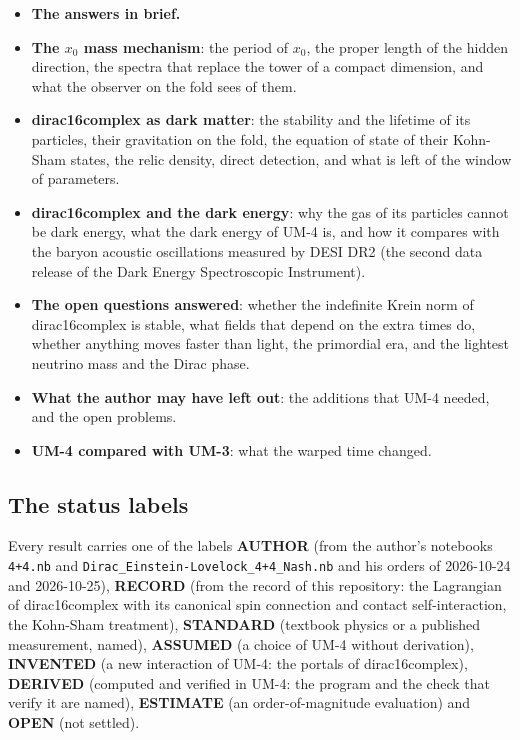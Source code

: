 \documentclass[
  10pt,
]{article}
\providecommand{\tightlist}{%
  \setlength{\itemsep}{0pt}\setlength{\parskip}{0pt}}
\begin{document}
\begin{itemize}
\tightlist
\item
  \textbf{The answers in brief.}
\item
  \textbf{The \(x_0\) mass mechanism}: the period of \(x_0\), the proper
  length of the hidden direction, the spectra that replace the tower of
  a compact dimension, and what the observer on the fold sees of them.
\item
  \textbf{dirac16complex as dark matter}: the stability and the lifetime
  of its particles, their gravitation on the fold, the equation of state
  of their Kohn-Sham states, the relic density, direct detection, and
  what is left of the window of parameters.
\item
  \textbf{dirac16complex and the dark energy}: why the gas of its
  particles cannot be dark energy, what the dark energy of UM-4 is, and
  how it compares with the baryon acoustic oscillations measured by DESI
  DR2 (the second data release of the Dark Energy Spectroscopic
  Instrument).
\item
  \textbf{The open questions answered}: whether the indefinite Krein
  norm of dirac16complex is stable, what fields that depend on the extra
  times do, whether anything moves faster than light, the primordial
  era, and the lightest neutrino mass and the Dirac phase.
\item
  \textbf{What the author may have left out}: the additions that UM-4
  needed, and the open problems.
\item
  \textbf{UM-4 compared with UM-3}: what the warped time changed.
\end{itemize}

\hypertarget{the-status-labels}{%
\subsection{The status labels}\label{the-status-labels}}

Every result carries one of the labels \textbf{AUTHOR} (from the
author's notebooks \texttt{4+4.nb} and
\texttt{Dirac\_Einstein-Lovelock\_4+4\_Nash.nb} and his orders of
2026-10-24 and 2026-10-25), \textbf{RECORD} (from the record of this
repository: the Lagrangian of dirac16complex with its canonical spin
connection and contact self-interaction, the Kohn-Sham treatment),
\textbf{STANDARD} (textbook physics or a published measurement, named),
\textbf{ASSUMED} (a choice of UM-4 without derivation),
\textbf{INVENTED} (a new interaction of UM-4: the portals of
dirac16complex), \textbf{DERIVED} (computed and verified in UM-4: the
program and the check that verify it are named), \textbf{ESTIMATE} (an
order-of-magnitude evaluation) and \textbf{OPEN} (not settled).
\end{document}
